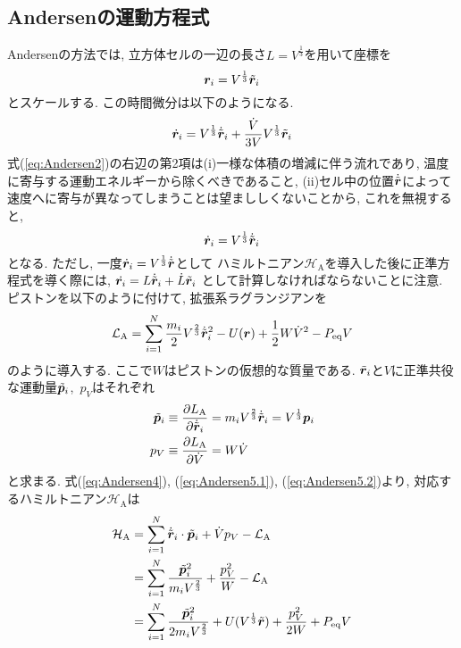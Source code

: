 \subsection{Andersenの運動方程式}
Andersenの方法では, 立方体セルの一辺の長さ$L=V^{\frac{1}{3}}$を用いて座標を
\begin{equation}
 \bm{r}_{i} = V^{\frac{1}{3}} \Tilde{\bm{r}}_{i}
 \label{eq:Andersen1}
\end{equation}
とスケールする. この時間微分は以下のようになる. 
\begin{equation}
 \dot{\bm{r}}_{i}
  = V^{\frac{1}{3}} \dot{\Tilde{\bm{r}}}_{i}
  + \frac{\dot{V}}{3V} V^{\frac{1}{3}} \tilde{\bm{r}}_{i}
  \label{eq:Andersen2}
\end{equation}
式(\ref{eq:Andersen2})の右辺の第2項は(i)一様な体積の増減に伴う流れであり, 温度に寄与する運動エネルギーから除くべきであること, 
(ii)セル中の位置$\dot{\Tilde{\bm{r}}}$によって速度へに寄与が異なってしまうことは望まししくないことから, これを無視すると, 
\begin{equation}
 \dot{\bm{r}}_{i}
  = V^{\frac{1}{3}} \dot{\Tilde{\bm{r}}}_{i}
 \label{eq:Andersen3}
\end{equation}
となる. ただし, 一度$\dot{\bm{r}}_{i} = V^{\frac{1}{3}}\dot{\Tilde{\bm{r}}}$として
ハミルトニアン$\mathcal{H}_{\mathrm{A}}$を導入した後に正準方程式を導く際には, 
$\dot{\bm{r}_{i}} = L \dot{\Tilde{\bm{r}}}_{i}+\dot{L}\Tilde{\bm{r}}_{i}$
として計算しなければならないことに注意. 
ピストンを以下のように付けて, 拡張系ラグランジアンを
\begin{equation}
 \mathcal{L}_{\mathrm{A}}
  =
  \sum_{i=1}^{N} \frac{m_{i}}{2} V^{\frac{2}{3}} \dot{\Tilde{\bm{r}}}_{i}^{2}
  - U(\bm{r}) + \frac{1}{2} W \dot{V}^{2} - P_{\mathrm{eq}}V
 \label{eq:Andersen4}
\end{equation}
のように導入する. 
ここで$W$はピストンの仮想的な質量である.
$\Tilde{\bm{r}}_{i}$と$V$に正準共役な運動量$\Tilde{\bm{p}}_{i}$,~$p_{V}$はそれぞれ
\begin{align}
 \Tilde{\bm{p}}_{i}
 &\equiv
 \frac{\partial L_{\mathrm{A}}}{\partial \dot{\Tilde{\bm{r}}}_{i}}
 =
 m_{i} V^{\frac{2}{3}} \dot{\Tilde{\bm{r}}}_{i}
 =
 V^{\frac{1}{3}} \bm{p}_{i}
 \label{eq:Andersen5.1}
 \\
 p_{V}
 &\equiv
 \frac{\partial L_{\mathrm{A}}}{\partial \dot{V}}
 =
 W \dot{V}
 \label{eq:Andersen5.2}
\end{align}
と求まる. 
式(\ref{eq:Andersen4}), (\ref{eq:Andersen5.1}), (\ref{eq:Andersen5.2})より, 対応するハミルトニアン$\mathcal{H}_{\mathrm{A}}$は
\begin{align}
 \mathcal{H}_{\mathrm{A}}
 &=
 \sum_{i=1}^{N} \dot{\Tilde{\bm{r}}}_{i} \cdot \Tilde{\bm{p}}_{i}
 + \dot{V} p_{V} - \mathcal{L}_{\mathrm{A}}
 \notag
 \\
 &=
 \sum_{i=1}^{N} \frac{\Tilde{\bm{p}}_{i}^{2}}{m_{i} V^{\frac{2}{3}}}
 + \frac{p_{V}^2}{W} - \mathcal{L}_{\mathrm{A}}
 \notag
 \\
 &=
 \sum_{i=1}^{N} \frac{\Tilde{\bm{p}}_{i}^{2}}{2 m_{i} V^{\frac{2}{3}}}
 + U(V^{\frac{1}{3}} \Tilde{\bm{r}})
 + \frac{p_{V}^2}{2W} + P_{\mathrm{eq}}V
 \label{eq:Andersen6}
\end{align}
